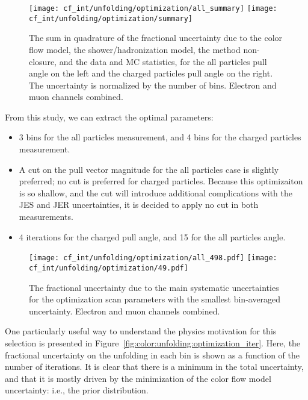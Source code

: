 %
\begin{figure}[h!]
  \begin{center}
    \texttt{[image: cf\_int/unfolding/optimization/all\_summary]}
    \texttt{[image: cf\_int/unfolding/optimization/summary]}
    \caption{The sum in quadrature of the fractional uncertainty due to the color flow model, the shower/hadronization model, the method non-closure, and the data and MC statistics, for the all particles pull angle on the left and the charged particles pull angle on the right.  The uncertainty is normalized by the number of bins.  Electron and muon channels combined.}
    \label{fig:color:unfolding:optimizationsummary}
  \end{center}
\end{figure}
%

	From this study, we can extract the optimal parameters:
	\begin{itemize}
	\item 3 bins for the all particles measurement, and 4 bins for the charged particles measurement.
	\item A cut on the pull vector magnitude for the all particles case is slightly preferred; no cut is preferred for charged particles. Because this optimizaiton is so shallow, and the cut will introduce additional complications with the JES and JER uncertainties, it is decided to apply no cut in both measurements.
	\item 4 iterations for the charged pull angle, and 15 for the all particles angle.
	\end{itemize}


%
\begin{figure}[h!]
  \begin{center}
    \texttt{[image: cf\_int/unfolding/optimization/all\_498.pdf]}
    \texttt{[image: cf\_int/unfolding/optimization/49.pdf]}
    \caption{The fractional uncertainty due to the main systematic uncertainties for the optimization scan parameters with the smallest bin-averaged uncertainty.  Electron and muon channels combined.}
    \label{fig:color:unfolding:optimizationsummarywinners}
  \end{center}
\end{figure}
%

	One particularly useful way to understand the physics motivation for this selection is presented in Figure~\ref{fig:color:unfolding:optimization_iter}. Here, the fractional uncertainty on the unfolding in each bin is shown as a function of the number of iterations. It is clear that there is a minimum in the total uncertainty, and that it is mostly driven by the minimization of the color flow model uncertainty: i.e., the prior distribution. 

